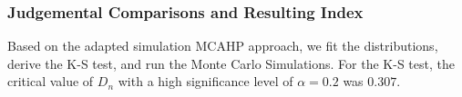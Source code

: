 \documentclass[a4paper]{article}
\begin{document}
%

\subsubsection{Judgemental Comparisons and Resulting Index}
Based on the adapted simulation MCAHP approach, we fit the distributions, derive the K-S test, and run the Monte Carlo Simulations. 
 For the K-S test, the critical value of $D_n$ with a high significance level of $\alpha=0.2$ was $0.307$.
\end{document}
